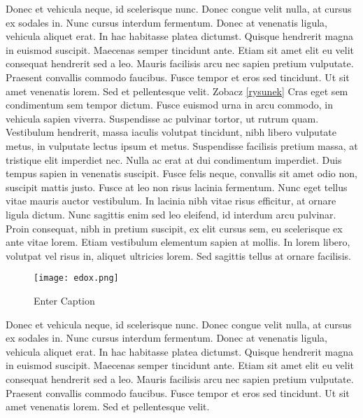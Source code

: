 \documentclass[12pt]{article}
\begin{document}
Donec et vehicula neque, id scelerisque nunc. Donec congue velit nulla, at cursus ex sodales in. Nunc cursus interdum fermentum. Donec at venenatis ligula, vehicula aliquet erat. In hac habitasse platea dictumst. Quisque hendrerit magna in euismod suscipit. Maecenas semper tincidunt ante. Etiam sit amet elit eu velit consequat hendrerit sed a leo. Mauris facilisis arcu nec sapien pretium vulputate. Praesent convallis commodo faucibus. Fusce tempor et eros sed tincidunt. Ut sit amet venenatis lorem. Sed et pellentesque velit. 
Zobacz \ref{rysunek}
 Cras eget sem condimentum sem tempor dictum. Fusce euismod urna in arcu commodo, in vehicula sapien viverra. Suspendisse ac pulvinar tortor, ut rutrum quam. Vestibulum hendrerit, massa iaculis volutpat tincidunt, nibh libero vulputate metus, in vulputate lectus ipsum et metus. Suspendisse facilisis pretium massa, at tristique elit imperdiet nec. Nulla ac erat at dui condimentum imperdiet. Duis tempus sapien in venenatis suscipit. Fusce felis neque, convallis sit amet odio non, suscipit mattis justo. Fusce at leo non risus lacinia fermentum. Nunc eget tellus vitae mauris auctor vestibulum. In lacinia nibh vitae risus efficitur, at ornare ligula dictum. Nunc sagittis enim sed leo eleifend, id interdum arcu pulvinar. Proin consequat, nibh in pretium suscipit, ex elit cursus sem, eu scelerisque ex ante vitae lorem. Etiam vestibulum elementum sapien at mollis. In lorem libero, volutpat vel risus in, aliquet ultricies lorem. Sed sagittis tellus at ornare facilisis.

 
\begin{figure}
    \centering
    \texttt{[image: edox.png]}
    \caption{Enter Caption}
    \label{fig:rysunek2}
\end{figure}
Donec et vehicula neque, id scelerisque nunc. Donec congue velit nulla, at cursus ex sodales in. Nunc cursus interdum fermentum. Donec at venenatis ligula, vehicula aliquet erat. In hac habitasse platea dictumst. Quisque hendrerit magna in euismod suscipit. Maecenas semper tincidunt ante. Etiam sit amet elit eu velit consequat hendrerit sed a leo. Mauris facilisis arcu nec sapien pretium vulputate. Praesent convallis commodo faucibus. Fusce tempor et eros sed tincidunt. Ut sit amet venenatis lorem. Sed et pellentesque velit. 

\cite{Autor3}
\cite{Autor4}
\cite{Autor5}
\cite{Autor6}
\cite{Autor7}
\end{document}

